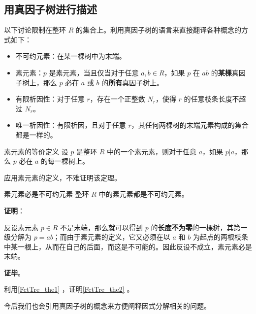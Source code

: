 

\subsection{用真因子树进行描述}

以下讨论限制在整环 $R$ 的集合上。利用真因子树的语言来直接翻译各种概念的方式如下：

\begin{definition}{}\label{FctTre_def1}
\begin{itemize}
\item 不可约元素：在某一棵树中为末端。
\item 素元素：$p$ 是素元素，当且仅当对于任意 $a, b\in R$，如果 $p$ 在 $ab$ 的\textbf{某棵}真因子树上，那么 $p$ 必在 $a$ 或 $b$ 的\textbf{所有}真因子树上。
\item 有限析因性：对于任意 $r$，存在一个正整数 $N_r$，使得 $r$ 的任意枝条长度不超过 $N_r$。
\item 唯一析因性：有限析因，且对于任意 $r$，其任何两棵树的末端元素构成的集合都是一样的。
\end{itemize}
\end{definition}

\begin{theorem}{素元素的等价定义}\label{FctTre_the1}
设 $p$ 是整环 $R$ 中的一个素元素，则对于任意 $a$，如果 $p|a$，那么 $p$ 必在 $a$ 的每一棵树上。
\end{theorem}

应用素元素的定义，不难证明该定理。


\begin{theorem}{素元素必是不可约元素}\label{FctTre_the2}
整环 $R$ 中的素元素都是不可约元素。
\end{theorem}

\textbf{证明}：

反设素元素 $p\in R$ 不是末端，那么就可以得到 $p$ 的\textbf{长度不为零}的一棵树，其第一级分解为 $p=ab$；而由于素元素的定义，它又必须在以 $a$ 和 $b$ 为起点的两根枝条中某一根上，从而在自己的后面，而这是不可能的。因此反设不成立，素元素必是末端。

\textbf{证毕}。

\begin{exercise}{}\label{FctTre_exe1}
利用\autoref{FctTre_the1} ，证明\autoref{FctTre_the2} 。
\end{exercise}

今后我们也会引用真因子树的概念来方便阐释因式分解相关的问题。

